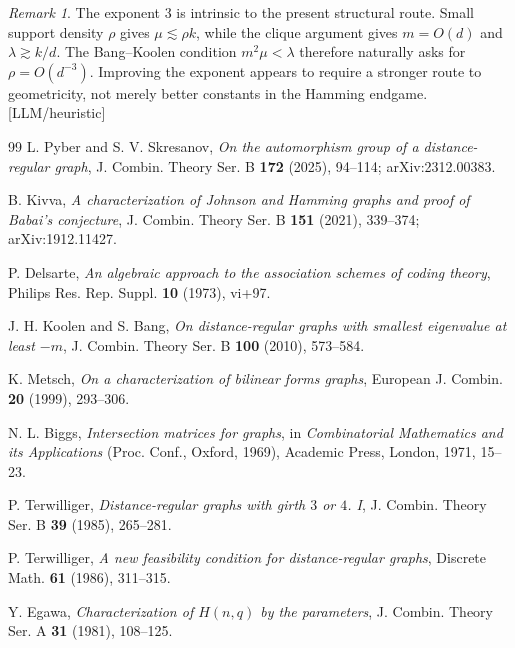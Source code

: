 \documentclass[10pt]{amsart}
\theoremstyle{remark}
\newtheorem{remark}[theorem]{Remark}
\newcommand{\prov}[1]{\unskip\, {\normalfont\scriptsize\color{provgray}\textsf{[#1]}}}
\begin{document}
\begin{remark}
The exponent $3$ is intrinsic to the present structural route. Small support density $\rho$ gives $\mu\lesssim\rho k$, while the clique argument gives $m=O(d)$ and $\lambda\gtrsim k/d$. The Bang--Koolen condition $m^2\mu<\lambda$ therefore naturally asks for $\rho=O(d^{-3})$. Improving the exponent appears to require a stronger route to geometricity, not merely better constants in the Hamming endgame.\prov{LLM/heuristic}
\end{remark}

\begin{thebibliography}{99}
L. Pyber and S. V. Skresanov,
\emph{On the automorphism group of a distance-regular graph},
J. Combin. Theory Ser. B \textbf{172} (2025), 94--114; arXiv:2312.00383.

B. Kivva,
\emph{A characterization of Johnson and Hamming graphs and proof of Babai's conjecture},
J. Combin. Theory Ser. B \textbf{151} (2021), 339--374; arXiv:1912.11427.

P. Delsarte,
\emph{An algebraic approach to the association schemes of coding theory},
Philips Res. Rep. Suppl. \textbf{10} (1973), vi+97.

J. H. Koolen and S. Bang,
\emph{On distance-regular graphs with smallest eigenvalue at least $-m$},
J. Combin. Theory Ser. B \textbf{100} (2010), 573--584.

K. Metsch,
\emph{On a characterization of bilinear forms graphs},
European J. Combin. \textbf{20} (1999), 293--306.

N. L. Biggs,
\emph{Intersection matrices for graphs},
in \emph{Combinatorial Mathematics and its Applications} (Proc. Conf., Oxford, 1969),
Academic Press, London, 1971, 15--23.

P. Terwilliger,
\emph{Distance-regular graphs with girth $3$ or $4$. I},
J. Combin. Theory Ser. B \textbf{39} (1985), 265--281.

P. Terwilliger,
\emph{A new feasibility condition for distance-regular graphs},
Discrete Math. \textbf{61} (1986), 311--315.

Y. Egawa,
\emph{Characterization of $H(n,q)$ by the parameters},
J. Combin. Theory Ser. A \textbf{31} (1981), 108--125.
\end{thebibliography}
\end{document}
